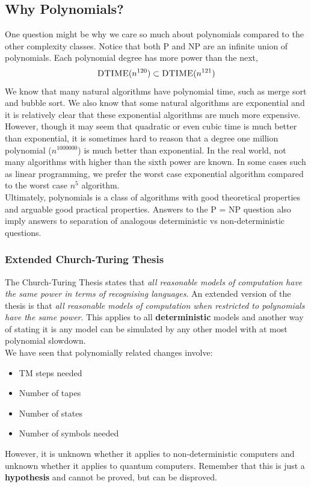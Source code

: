 \documentclass{article}
\theoremstyle{definition}
\newcommand{\n}[0]{\\[\baselineskip]}
\begin{document}
\subsection{Why Polynomials?}
One question might be why we care so much about polynomials compared to the other complexity classes. Notice that both \textsc{P} and \textsc{NP} are an infinite union of polynomials. Each polynomial degree has more power than the next,
\begin{equation}
\textsc{DTIME}(n^{120}) \subset \textsc{DTIME}(n^{121})
\end{equation}
We know that many natural algorithms have polynomial time, such as merge sort and bubble sort. We also know that some natural algorithms are exponential and it is relatively clear that these exponential algorithms are much more expensive. 
\n
However, though it may seem that quadratic or even cubic time is much better than exponential, it is sometimes hard to reason that a degree one million polynomial ($n^{1000000}$) is much better than exponential. In the real world, not many algorithms with higher than the sixth power are known. In some cases such as linear programming, we prefer the worst case exponential algorithm compared to the worst case $n^5$ algorithm.
\n
Ultimately, polynomials is a class of algorithms with good theoretical properties and arguable good practical properties. Answers to the P = NP question also imply answers to separation of analogous deterministic vs non-deterministic questions.
\subsubsection{Extended Church-Turing Thesis}
The Church-Turing Thesis states that \textit{all reasonable models of computation have the same power in terms of recognising languages}. An extended version of the thesis is that \textit{all reasonable models of computation when restricted to polynomials have the same power}. This applies to all \textbf{deterministic} models and another way of stating it is any model can be simulated by any other model with at most polynomial slowdown. 
\n
We have seen that polynomially related changes involve:
\begin{itemize}
\item TM steps needed
\item Number of tapes
\item Number of states
\item Number of symbols needed
\end{itemize}
However, it is unknown whether it applies to non-deterministic computers and unknown whether it applies to quantum computers. Remember that this is just a \textbf{hypothesis} and cannot be proved, but can be disproved.
\end{document}
